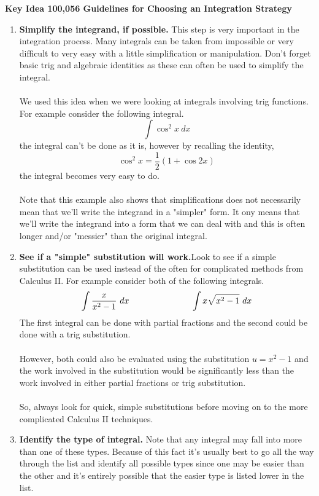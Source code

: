 \documentclass[11pt]{report}
\newlength\tindent
\renewcommand{\indent}{\hspace*{\tindent}}
\begin{document}
\textbf{Key Idea 100,056 \indent Guidelines for Choosing an Integration Strategy}

\begin{enumerate}
\item \textbf{Simplify the integrand, if possible.} This step is very important in the integration process. Many integrals can be taken from impossible or very difficult to very easy with a little simplification or manipulation. Don't forget basic trig and algebraic identities as these can often be used to simplify the integral.\\ \\
We used this idea when we were looking at integrals involving trig functions. For example consider the following integral. $$\int \cos^2 x~dx$$ the integral can't be done as it is, however by recalling the identity, $$\cos^2 x = \frac{1}{2}(1 + \cos 2x)$$ the integral becomes very easy to do.\\ \\
Note that this example also shows that simplifications does not necessarily mean that we'll write the integrand in a "simpler" form. It ony means that we'll write the integrand into a form that we can deal with and this is often longer and/or "messier" than the original integral.

\item \textbf{See if a "simple" substitution will work.}Look to see if a simple substitution can be used instead of the often for complicated methods from Calculus II. For example consider both of the following integrals. $$\int \frac{x}{x^2-1}~dx \hskip 1 truein \int x\sqrt{x^2 -1}~dx$$
The first integral can be done with partial fractions and the second could be done with a trig substitution.\\ \\
However, both could also be evaluated using the substitution $u=x^2 -1$ and the work involved in the substitution would be significantly less than the work involved in either partial fractions or trig substitution.\\ \\
So, always look for quick, simple substitutions before moving on to the more complicated Calculus II techniques.

\item \textbf{Identify the type of integral.} Note that any integral may fall into more than 
one of these types. Because of this fact it's usually best to go all the way through the list and identify all possible types since one may be easier than the other and it's entirely possible that the easier type is listed lower in the list.


\end{enumerate}
\end{document}
